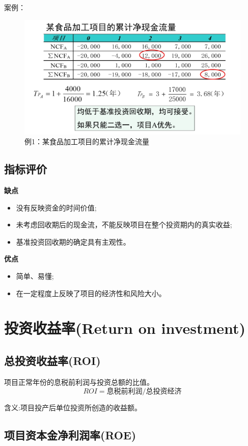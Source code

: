 案例：
\begin{figure}[h]
    \centering
    \includegraphics[width=\textwidth]{jxjll.png}
    \caption{例1：某食品加工项目的累计净现金流量}
    \label{fig:1}
\end{figure}

\subsection{指标评价}
\textbf{缺点}
\begin{itemize}
    \item 没有反映资金的时间价值;
    \item 未考虑回收期后的现金流，不能反映项目在整个投资期内的真实收益;
    \item 基准投资回收期的确定具有主观性。
\end{itemize}

\textbf{优点}
\begin{itemize}
    \item 简单、易懂;
    \item 在一定程度上反映了项目的经济性和风险大小。
\end{itemize}

\section{投资收益率(Return on investment)}

\subsection{总投资收益率(ROI)}

项目正常年份的息税前利润与投资总额的比值。
$$ROI=\mbox{息税前利润/总投资经济}$$

含义:项目投产后单位投资所创造的收益额。

\subsection{项目资本金净利润率(ROE)}

